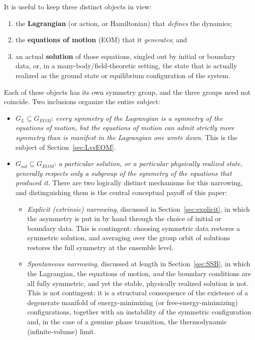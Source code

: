 It is useful to keep three distinct objects in view:
\begin{enumerate}
\item the \textbf{Lagrangian} (or action, or Hamiltonian) that \emph{defines} the dynamics;
\item the \textbf{equations of motion} (EOM) that it \emph{generates}; and
\item an actual \textbf{solution} of those equations, singled out by initial or boundary data, or, in a many-body/field-theoretic setting, the state that is actually realized as the ground state or equilibrium configuration of the system.
\end{enumerate}
Each of these objects has its own symmetry group, and the three groups need not
coincide. Two inclusions organize the entire subject:
\begin{itemize}
    \item $G_L \subseteq G_{EOM}$: \emph{every symmetry of the Lagrangian is a
        symmetry of the equations of motion, but the equations of motion can
        admit strictly more symmetry than is manifest in the Lagrangian one
        wrote down.} This is the subject of Section~\ref{sec:LvsEOM}.
    \item $G_{sol} \subseteq G_{EOM}$: \emph{a particular solution, or a
        particular physically realized state, generally respects only a
        subgroup of the symmetry of the equations that produced it.} There are
        two logically distinct mechanisms for this narrowing, and
        distinguishing them is the central conceptual payoff of this paper:
\begin{itemize}
\item \emph{Explicit (extrinsic) narrowing}, discussed in
    Section~\ref{sec:explicit}, in which the asymmetry is put in by hand
        through the choice of initial or boundary data. This is contingent:
        choosing symmetric data restores a symmetric solution, and averaging
        over the group orbit of solutions restores the full symmetry at the
        ensemble level.
\item \emph{Spontaneous narrowing}, discussed at length in
    Section~\ref{sec:SSB}, in which the Lagrangian, the equations of motion,
        \emph{and} the boundary conditions are all fully symmetric, and yet the
        stable, physically realized solution is not. This is not contingent: it
        is a structural consequence of the existence of a degenerate manifold
        of energy-minimizing (or free-energy-minimizing) configurations,
        together with an instability of the symmetric configuration and, in the
        case of a genuine phase transition, the thermodynamic (infinite-volume)
        limit.
\end{itemize}
\end{itemize}

